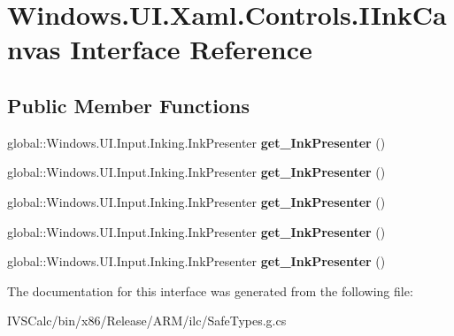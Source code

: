 \hypertarget{interface_windows_1_1_u_i_1_1_xaml_1_1_controls_1_1_i_ink_canvas}{}\section{Windows.\+U\+I.\+Xaml.\+Controls.\+I\+Ink\+Canvas Interface Reference}
\label{interface_windows_1_1_u_i_1_1_xaml_1_1_controls_1_1_i_ink_canvas}
\subsection*{Public Member Functions}
\begin{DoxyCompactItemize}
\item 
\mbox{\label{interface_windows_1_1_u_i_1_1_xaml_1_1_controls_1_1_i_ink_canvas_a9f4ae4320ec2e809c34787cdfc80ece0}} 
global\+::\+Windows.\+U\+I.\+Input.\+Inking.\+Ink\+Presenter {\bfseries get\+\_\+\+Ink\+Presenter} ()
\item 
\mbox{\label{interface_windows_1_1_u_i_1_1_xaml_1_1_controls_1_1_i_ink_canvas_a9f4ae4320ec2e809c34787cdfc80ece0}} 
global\+::\+Windows.\+U\+I.\+Input.\+Inking.\+Ink\+Presenter {\bfseries get\+\_\+\+Ink\+Presenter} ()
\item 
\mbox{\label{interface_windows_1_1_u_i_1_1_xaml_1_1_controls_1_1_i_ink_canvas_a9f4ae4320ec2e809c34787cdfc80ece0}} 
global\+::\+Windows.\+U\+I.\+Input.\+Inking.\+Ink\+Presenter {\bfseries get\+\_\+\+Ink\+Presenter} ()
\item 
\mbox{\label{interface_windows_1_1_u_i_1_1_xaml_1_1_controls_1_1_i_ink_canvas_a9f4ae4320ec2e809c34787cdfc80ece0}} 
global\+::\+Windows.\+U\+I.\+Input.\+Inking.\+Ink\+Presenter {\bfseries get\+\_\+\+Ink\+Presenter} ()
\item 
\mbox{\label{interface_windows_1_1_u_i_1_1_xaml_1_1_controls_1_1_i_ink_canvas_a9f4ae4320ec2e809c34787cdfc80ece0}} 
global\+::\+Windows.\+U\+I.\+Input.\+Inking.\+Ink\+Presenter {\bfseries get\+\_\+\+Ink\+Presenter} ()
\end{DoxyCompactItemize}


The documentation for this interface was generated from the following file\+:\begin{DoxyCompactItemize}
\item 
I\+V\+S\+Calc/bin/x86/\+Release/\+A\+R\+M/ilc/Safe\+Types.\+g.\+cs\end{DoxyCompactItemize}
